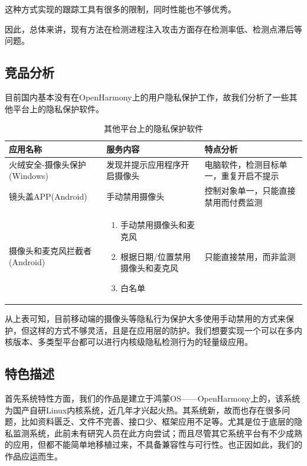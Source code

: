 \documentclass[12pt,a4paper]{ctexart}
\begin{document}
这种方式实现的跟踪工具有很多的限制，同时性能也不够优秀。


因此，总体来讲，现有方法在检测进程注入攻击方面存在检测率低、检测点滞后等问题。

\subsection{竞品分析}
目前国内基本没有在OpenHarmony上的用户隐私保护工作，故我们分析了一些其他平台上的隐私保护软件。


\vspace{0.3cm}
\begin{table}
\begin{tabular}{|p{3cm}|p{6cm}|p{3cm}|}
  \hline
  \rowcolor{blue!50} 应用名称&服务内容&特点分析\\
  \hline
  火绒安全-摄像头保护(Windows)&发现并提示应用程序开启摄像头&电脑软件，检测目标单一，重复开启不提示\\
  \hline
  镜头盖APP(Android)&手动禁用摄像头&控制对象单一，只能直接禁用而付费监测\\
  \hline
  摄像头和麦克风拦截者(Android)&\begin{enumerate}
                                  \item 手动禁用摄像头和麦克风
                                  \item 根据日期/位置禁用摄像头和麦克风
                                        \item 白名单
                                \end{enumerate}&只能直接禁用，而非监测\\
  \hline
\end{tabular}
\caption{其他平台上的隐私保护软件}
\end{table}

从上表可知，目前移动端的摄像头等隐私行为保护大多使用手动禁用的方式来保护，但这样的方式不够灵活，且是在应用层的防护。我们想要实现一个可以在多内核版本、多类型平台都可以进行内核级隐私检测行为的轻量级应用。

\subsection{特色描述}
首先系统特性方面，我们的作品是建立于鸿蒙OS——OpenHarmony上的，该系统为国产自研Linux内核系统，近几年才兴起火热。其系统新，故而也存在很多问题，比如资料匮乏、文件不完善、接口少、框架应用不足等。尤其是位于底层的隐私监测系统，此前未有研究人员在此方向尝试；而且尽管其它系统平台有不少成熟的应用，但都不能简单地移植过来，不具备兼容性与可行性。也正因如此，我们的作品应运而生。
\end{document}
